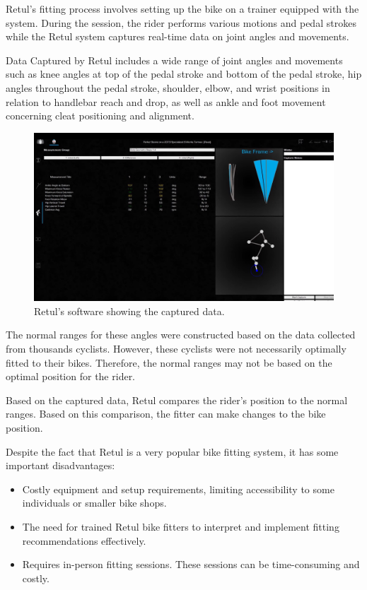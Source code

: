 Retul's fitting process involves setting up the bike on a trainer equipped with the system. During the session, the rider performs various motions and pedal strokes while the Retul system captures real-time data on joint angles and movements.

Data Captured by Retul includes a wide range of joint angles and movements such as knee angles at top of the pedal stroke and bottom of the pedal stroke, hip angles throughout the pedal stroke, shoulder, elbow, and wrist positions in relation to handlebar reach and drop, as well as ankle and foot movement concerning cleat positioning and alignment.

\begin{figure}[htbp]
    \centering
    \includegraphics[width=\textwidth]{obrazky-figures/retul_app.png}
    \caption{Retul's software showing the captured data.}
    \label{fig:retul_app}
\end{figure}

The normal ranges for these angles were constructed based on the data collected from thousands cyclists. However, these cyclists were not necessarily optimally fitted to their bikes. Therefore, the normal ranges may not be based on the optimal position for the rider.

Based on the captured data, Retul compares the rider's position to the normal ranges. Based on this comparison, the fitter can make changes to the bike position.

Despite the fact that Retul is a very popular bike fitting system, it has some important disadvantages:
\begin{itemize}
    \item Costly equipment and setup requirements, limiting accessibility to some individuals or smaller bike shops.
    \item The need for trained Retul bike fitters to interpret and implement fitting recommendations effectively.
    \item Requires in-person fitting sessions. These sessions can be time-consuming and costly.
\end{itemize}


